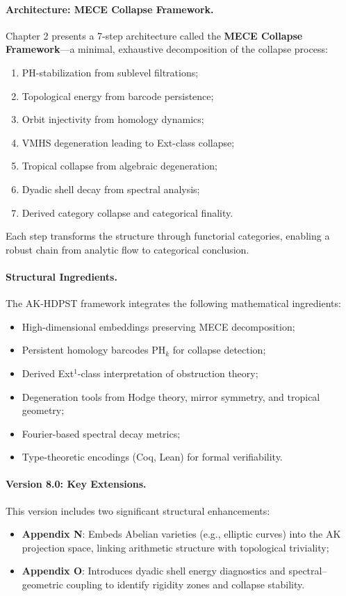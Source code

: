 \documentclass[11pt]{article}
\begin{document}
\paragraph{Architecture: MECE Collapse Framework.}
Chapter 2 presents a 7-step architecture called the \textbf{MECE Collapse Framework}—a minimal, exhaustive decomposition of the collapse process:
\begin{enumerate}
  \item PH-stabilization from sublevel filtrations;
  \item Topological energy from barcode persistence;
  \item Orbit injectivity from homology dynamics;
  \item VMHS degeneration leading to Ext-class collapse;
  \item Tropical collapse from algebraic degeneration;
  \item Dyadic shell decay from spectral analysis;
  \item Derived category collapse and categorical finality.
\end{enumerate}
Each step transforms the structure through functorial categories, enabling a robust chain from analytic flow to categorical conclusion.

\paragraph{Structural Ingredients.}
The AK-HDPST framework integrates the following mathematical ingredients:
\begin{itemize}
  \item High-dimensional embeddings preserving MECE decomposition;
  \item Persistent homology barcodes \( \mathrm{PH}_k \) for collapse detection;
  \item Derived Ext$^1$-class interpretation of obstruction theory;
  \item Degeneration tools from Hodge theory, mirror symmetry, and tropical geometry;
  \item Fourier-based spectral decay metrics;
  \item Type-theoretic encodings (Coq, Lean) for formal verifiability.
\end{itemize}

\paragraph{Version 8.0: Key Extensions.}
This version includes two significant structural enhancements:
\begin{itemize}
  \item \textbf{Appendix N}: Embeds Abelian varieties (e.g., elliptic curves) into the AK projection space, linking arithmetic structure with topological triviality;
  \item \textbf{Appendix O}: Introduces dyadic shell energy diagnostics and spectral–geometric coupling to identify rigidity zones and collapse stability.
\end{itemize}
\end{document}
